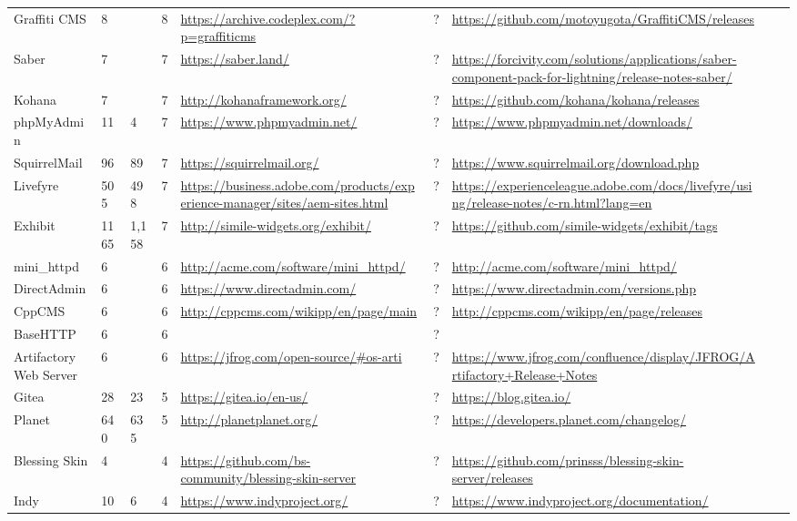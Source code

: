 \begin{table}[!htp]
\begin{tabular}{|l|l|l|l|l|l|l|l|l|}
				Graffiti CMS &8 & &8 &\ul{https://archive.codeplex.com/?p=graffiticms} &? &\ul{https://github.com/motoyugota/GraffitiCMS/releases} & \\
				Saber &7 & &7 &\ul{https://saber.land/} &? &\ul{https://forcivity.com/solutions/applications/saber-component-pack-for-lightning/release-notes-saber/} & \\
				Kohana &7 & &7 &\ul{http://kohanaframework.org/} &? &\ul{https://github.com/kohana/kohana/releases} & \\
				phpMyAdmin &11 &4 &7 &\ul{https://www.phpmyadmin.net/} &? &\ul{https://www.phpmyadmin.net/downloads/} & \\
				SquirrelMail &96 &89 &7 &\ul{https://squirrelmail.org/} &? &\ul{https://www.squirrelmail.org/download.php} & \\
				Livefyre &505 &498 &7 &\ul{https://business.adobe.com/products/experience-manager/sites/aem-sites.html} &? &\ul{https://experienceleague.adobe.com/docs/livefyre/using/release-notes/c-rn.html?lang=en} & \\
				Exhibit &1165 &1,158 &7 &\ul{http://simile-widgets.org/exhibit/} &? &\ul{https://github.com/simile-widgets/exhibit/tags} & \\
				mini\_httpd &6 & &6 &\ul{http://acme.com/software/mini\_httpd/} &? &\ul{http://acme.com/software/mini\_httpd/} & \\
				DirectAdmin &6 & &6 &\ul{https://www.directadmin.com/} &? &\ul{https://www.directadmin.com/versions.php} & \\
				CppCMS &6 & &6 &\ul{http://cppcms.com/wikipp/en/page/main} &? &\ul{http://cppcms.com/wikipp/en/page/releases} & \\
				BaseHTTP &6 & &6 & &? & & \\
				Artifactory Web Server &6 & &6 &\ul{https://jfrog.com/open-source/\#os-arti} &? &\ul{https://www.jfrog.com/confluence/display/JFROG/Artifactory+Release+Notes} & \\
				Gitea &28 &23 &5 &\ul{https://gitea.io/en-us/} &? &\ul{https://blog.gitea.io/} & \\
				Planet &640 &635 &5 &\ul{http://planetplanet.org/} &? &\ul{https://developers.planet.com/changelog/} & \\
				Blessing Skin &4 & &4 &\ul{https://github.com/bs-community/blessing-skin-server} &? &\ul{https://github.com/prinsss/blessing-skin-server/releases} & \\
				Indy &10 &6 &4 &\ul{https://www.indyproject.org/} &? &\ul{https://www.indyproject.org/documentation/} & \\

\end{tabular}
\end{table}
